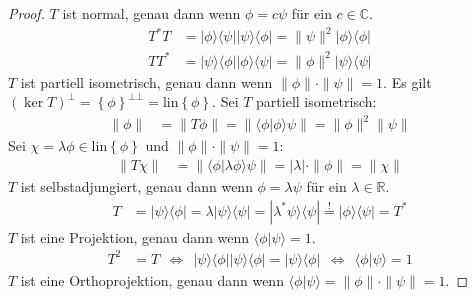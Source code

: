 \documentclass[a4paper,12pt]{article}
\newcommand{\bra}{}
\newcommand{\brak}{}
\newcommand{\klammer}{}
\newcommand{\oper}{}
\begin{document}
\begin{proof}
$T$ ist normal, genau dann wenn $\phi = c\psi$ für ein $c\in\mathbb{C}$. 
\begin{align*}
T^\ast T&=\oper |\phi\rangle\langle \psi|\oper |\psi\rangle\langle \phi|=\|\psi\|^2\oper |\phi\rangle\langle \phi| \\
TT^\ast &=\oper |\psi\rangle\langle \phi|\oper |\phi\rangle\langle \psi|=\|\phi\|^2\oper |\psi\rangle\langle \psi|
\end{align*}
$T$ ist partiell isometrisch, genau dann wenn $\|\phi\|\cdot\|\psi\|=1$. Es gilt $(\ker T)^\bot=\klammer\left\{ {\phi} \right\}^{\bot\bot}=\mathrm{lin}\klammer\left\{ {\phi} \right\}$. Sei $T$ partiell isometrisch:
\begin{align*}
\|\phi\|&=\|T\phi\|=\|\brak\langle {\phi}| {\phi}\rangle\psi\|=\|\phi\|^2\|\psi\|
\end{align*}
Sei $\chi=\lambda\phi\in\mathrm{lin}\klammer\left\{ {\phi} \right\}$ und $\|\phi\|\cdot\|\psi\|=1$:
\begin{align*}
\|T\chi\|&=\|\brak\langle {\phi}| {\lambda\phi}\rangle\psi\|=|\lambda|\cdot\|\phi\|=\|\chi\|
\end{align*}
$T$ ist selbstadjungiert, genau dann wenn $\phi=\lambda\psi$ für ein $\lambda\in\mathbb{R}$.
\begin{align*}
T&=\oper |\psi\rangle\langle \phi|=\lambda\oper |\psi\rangle\langle \psi|=\oper |\lambda^\ast\psi\rangle\langle \psi|\overset{!}{=}\oper |\phi\rangle\langle \psi|=T^\ast
\end{align*}
$T$ ist eine Projektion, genau dann wenn $\brak\langle {\phi}| {\psi}\rangle=1$.
\begin{align*}
T^2&=T \ \ \Leftrightarrow\ \ \oper |\psi\rangle\langle \phi|\oper |\psi\rangle\langle \phi|=\oper |\psi\rangle\langle \phi|\ \ \Leftrightarrow\ \ \bra\langle {\phi\vert\psi  }\rangle = 1
\end{align*}
$T$ ist eine Orthoprojektion, genau dann wenn $\brak\langle {\phi}| {\psi}\rangle=\|\phi\|\cdot\|\psi\|=1$.
\end{proof}
\end{document}
